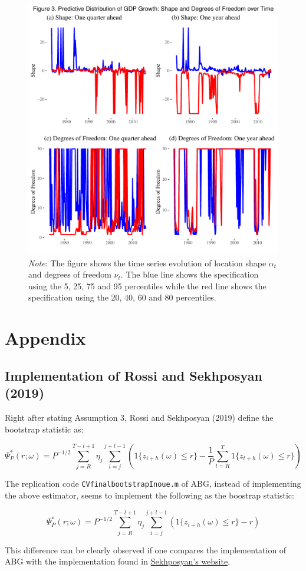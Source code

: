 \documentclass[11pt,]{article}
\begin{document}
\begin{figure}
\centering
\includegraphics{figures/figure3.pdf}
\caption{\emph{Note}: The figure shows the time series evolution of
location shape \(\alpha_t\) and degrees of freedom \(\nu_t\). The blue
line shows the specification using the 5, 25, 75 and 95 percentiles
while the red line shows the specification using the 20, 40, 60 and 80
percentiles.}
\end{figure}

\newpage

\hypertarget{appendix}{%
\section{Appendix}\label{appendix}}

\hypertarget{implementation-of-rossi-and-sekhposyan-2019}{%
\subsection{Implementation of Rossi and Sekhposyan
(2019)}\label{implementation-of-rossi-and-sekhposyan-2019}}

Right after stating Assumption 3, Rossi and Sekhposyan (2019) define the
bootstrap statistic as:

\[
\Psi_P^*(r; \omega) = P^{-1/2}\sum_{j=R}^{T-l+1}\eta_j \sum_{i=j}^{j+l-1} \left ( 1\{z_{i+h}(\omega) \leq r \} - \frac{1}{P}\sum_{t=R}^{T}1\{z_{t+h}(\omega) \leq r \} \right )
\]

The replication code \texttt{CVfinalbootstrapInoue.m} of ABG, instead of
implementing the above estimator, seems to implement the following as
the boostrap statistic:

\[
\Psi_P^*(r; \omega) = P^{-1/2}\sum_{j=R}^{T-l+1}\eta_j \sum_{i=j}^{j+l-1} \left ( 1\{z_{i+h}(\omega) \leq r \} - r \right )
\]

This difference can be clearly observed if one compares the
implementation of ABG with the implementation found in
\href{http://www.tateviksekhposyan.org/example.zip}{Sekhposyan's
website}.
\end{document}

